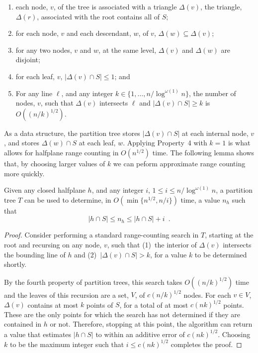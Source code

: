 \documentclass{patmorin}
\begin{document}
\begin{enumerate}
  \item each node, $v$, of the tree is associated with a triangle
    $\Delta(v)$, the triangle, $\Delta(r)$, associated with the root
    contains all of $S$;
  \item for each node, $v$ and each descendant, $w$, of $v$,
    $\Delta(w)\subseteq\Delta(v)$;
  \item for any two nodes, $v$ and $w$, at the same level, $\Delta(v)$
    and $\Delta(w)$ are disjoint; 
  \item for each leaf, $v$, $|\Delta(v)\cap S| \le 1$; and 
  \item For any line $\ell$, and any integer
    $k\in\{1,\ldots,n/\log^{\omega(1)} n\}$, the number of nodes, $v$,
    such that $\Delta(v)$ intersects $\ell$ and $|\Delta(v)\cap S|\ge k$
    is $O((n/k)^{1/2})$.
\end{enumerate}

As a data structure, the partition tree stores $|\Delta(v)\cap S|$
at each internal node, $v$, and stores $\Delta(w)\cap S$ at each
leaf, $w$.  Applying Property~4 with $k=1$ is what allows for halfplane
range counting in $O(n^{1/2})$ time.  The following lemma shows that,
by choosing larger values of $k$ we can peform approximate range
counting more quickly.

\begin{lem}
  Given any closed halfplane $h$, and any integer $i$, $1\le i\le
  n/\log^{\omega(1)} n$, a partition tree $T$ can be used to determine,
  in $O(\min\{n^{1/2},n/i\})$ time, a value $n_h$ such that 
  \[ |h\cap S| \le n_h \le |h\cap S|+i \enspace .\]
\end{lem}

\begin{proof}
  Consider performing a standard range-counting  search in $T$, starting
  at the root and recursing on any node, $v$, such that (1)~the
  interior of $\Delta(v)$ intersects the bounding line of $h$ and
  (2)~$|\Delta(v)\cap S| > k$, for a value $k$ to be determined shortly.

  By the fourth property of partition trees, this search takes
  $O((n/k)^{1/2})$ time and the leaves of this recursion are a set, $V$,
  of $c(n/k)^{1/2}$ nodes.  For each $v\in V$, $\Delta(v)$ contains at
  most $k$ points of $S$, for a total of at most $c(nk)^{1/2}$ points.
  These are the only points for which the search has not determined if
  they are contained in $h$ or not.  Therefore, stopping at this point,
  the algorithm can return a value that estimates $|h\cap S|$ to within
  an additive error of $c(nk)^{1/2}$.  Choosing $k$ to be the maximum
  integer such that $i \le c(nk)^{1/2}$ completes the proof.
\end{proof}
\end{document}
